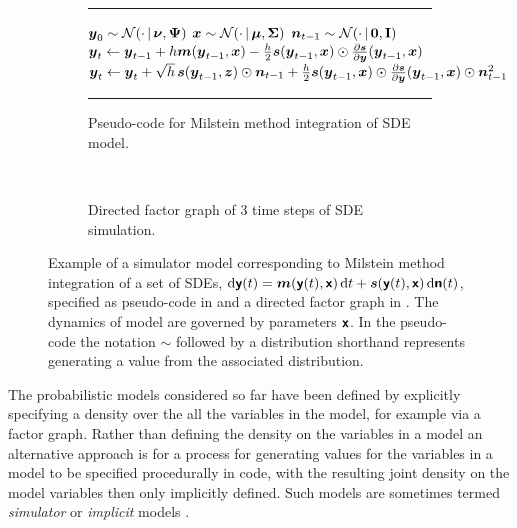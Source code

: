 \begin{figure}[!t]
\centering
\begin{subfigure}[b]{\linewidth}
\vskip 0pt
\centering
\hrule
\vskip 3pt
\begin{algorithmic}
\small
\State $\vct{y}_0 \sim \nrm{\cdot \gvn \vct{\nu},\mtx{\Psi}}$
\State $\vct{x} \sim \nrm{\cdot \gvn \vct{\mu},\mtx{\Sigma}}$
  \State $\vct{n}_{t-1} \sim \nrm{\cdot \gvn \vct{0},\idmtx}$
  \State $\boldsymbol{y}_{t} \gets \boldsymbol{y}_{t-1} + h \boldsymbol{m}(\boldsymbol{y}_{t-1},\boldsymbol{x}) - \frac{h}{2} \boldsymbol{s}(\boldsymbol{y}_{t-1},\boldsymbol{x})\odot\frac{\partial \boldsymbol{s}}{\partial \boldsymbol{y}}(\boldsymbol{y}_{t-1},\boldsymbol{x})$
  \State $\boldsymbol{y}_{t} \gets \boldsymbol{y}_{t}  + \sqrt{h} \, \boldsymbol{s}(\boldsymbol{y}_{t-1},\boldsymbol{z})\odot \boldsymbol{n}_{t-1} + \frac{h}{2} \boldsymbol{s}(\boldsymbol{y}_{t-1},\boldsymbol{x})\odot\frac{\partial \boldsymbol{s}}{\partial \boldsymbol{y}}(\boldsymbol{y}_{t-1},\boldsymbol{x}) \odot \boldsymbol{n}_{t-1}^2$
\EndFor
\end{algorithmic}
\vskip 3pt
\hrule
\vskip 3pt
\captionsetup{justification=centering}
\caption{Pseudo-code for Milstein method integration of \ac{SDE} model. } %
\label{sfig:sim-model-code} %
\end{subfigure}%
\\[2ex]
\begin{subfigure}[b]{\linewidth}
\vskip 0pt
\centering
{}
\caption{Directed factor graph of 3 time steps of \ac{SDE} simulation.}
\label{sfig:sim-model-factor-graph}
\end{subfigure}%
\caption[Simulator model example.]{Example of a simulator model corresponding to Milstein method integration of a set of \acsp{SDE}, $\dr \rvct{y}(t) = \vct{m}\lpa\rvct{y}(t),\rvct{x}\rpa \,\dr t + \vct{s}\lpa\rvct{y}(t),\rvct{x}\rpa \, \dr\rvct{n}(t)$, specified as pseudo-code in  and a directed factor graph in . The dynamics of model are governed by parameters $\boldsymbol{\mathsf{x}}$. In the pseudo-code the notation $\sim$ followed by a distribution shorthand represents generating a value from the associated distribution.} %
\label{fig:simulator-model-example}
\end{figure}

The probabilistic models considered so far have been defined by explicitly specifying a density over the all the variables in the model, for example via a factor graph. Rather than defining the density on the variables in a model an alternative approach is for a process for generating values for the variables in a model to be specified procedurally in code, with the resulting joint density on the model variables then only implicitly defined. Such models are sometimes termed \emph{simulator} or \emph{implicit} models \citep{diggle1984monte}. %

